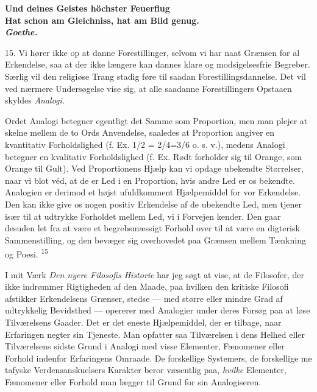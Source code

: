 \documentclass[12pt,a4paper,openany]{book}
\newcommand{\opage}[1]{\marginnote{\footnotesize\textit{[#1]}}}
\begin{document}
\begin{flushright}\begin{minipage}{0.55\textwidth}\small\bfseries
Und deines Geistes höchster Feuerflug\\
Hat schon am Gleichniss, hat am Bild genug.\\
\hfill\textit{Goethe.}
\end{minipage}\end{flushright}

15. Vi hører ikke op at danne Forestillinger, selvom vi har naat Grænsen
for al Erkendelse, saa at der ikke længere kan dannes klare og
modsigelsesfrie Begreber. Særlig vil den religiøse Trang stadig føre til
saadan Forestillingsdannelse. Det vil ved nærmere Undersøgelse vise sig,
at alle saadanne Forestillingers Opstaaen skyldes \textit{Analogi.}

Ordet Analogi betegner egentligt det Samme som Proportion, men man
plejer at skelne mellem de to Ords Anvendelse, saaledes at Proportion
angiver en kvantitativ Forholdslighed (f. Ex. 1/2 = 2/4=3/6 o. s. v.),
medens Analogi betegner en kvalitativ Forholdslighed (f. Ex. Rødt
forholder sig til Orange, som Orange til Gult). Ved Proportionens Hjælp
kan vi opdage ubekendte Størrelser, naar vi blot véd, at de er Led i en
Proportion, hvis andre Led er os bekendte. Analogien er derimod et højst
ufuldkomment Hjælpemiddel for vor Erkendelse. Den kan ikke give os nogen
positiv Erkendelse af de ubekendte Led, men tjener især til at udtrykke
Forholdet mellem Led, vi i Forvejen kender. Den gaar desuden let fra at
være et begrebsmæssigt Forhold over til at være en digterisk
Sammenstilling, og den bevæger sig overhovedet paa Grænsen mellem
Tænkning og Poesi. \textsuperscript{15}

I mit Værk \textit{Den nyere Filosofis Historie} har jeg søgt at vise,
at de Filosofer, der ikke indrømmer Rigtigheden af den Maade, paa
hvilken den kritiske Filosofi afstikker Erkendelsens Grænser, stedse ---
med større eller mindre Grad af udtrykkelig Bevidsthed --- opererer med
Analogier under deres Forsøg paa at løse Tilværelsens Gaader. Det er det
eneste Hjælpemiddel, der er tilbage, naar Erfaringen negter sin
Tjeneste. Man opfatter saa Tilværelsen i dens Helhed eller Tilværelsens
sidste Grund i Analogi med visse Elementer, Fænomener eller Forhold
indenfor Erfaringens Omraade. De forskellige Systemers, de forskellige
me%
\opage{40}tafyske Verdensanskuelsers Karakter beror væsentlig paa,
\textit{hvilke} Elementer, Fænomener eller Forhold man lægger til Grund
for sin Analogiseren.
\end{document}
